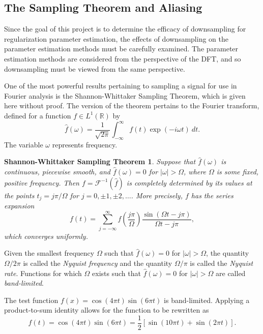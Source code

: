 \documentclass[12pt]{article}
\newcommand{\fcon}{f}
\newtheorem*{SWST}{Shannon-Whittaker Sampling Theorem}
\begin{document}
\subsection{The Sampling Theorem and Aliasing} \label{sec:The Sampling Theorem and Aliasing}
Since the goal of this project is to determine the efficacy of downsampling for regularization parameter estimation, the effects of downsampling on the parameter estimation methods must be carefully examined. The parameter estimation methods are considered from the perspective of the DFT, and so downsampling must be viewed from the same perspective. \par 
One of the most powerful results pertaining to sampling a signal for use in Fourier analysis is the Shannon-Whittaker Sampling Theorem, which is given here without proof. The version of the theorem pertains to the Fourier transform, defined for a function $f \in L^1(\mathbb{R})$ by
\begin{equation}
\widehat{f}(\omega) = \frac{1}{\sqrt{2\pi}}\int_{-\infty}^{\infty} f(t)\exp(-i\omega{t})\: dt. 
\label{eq:FourierTransform}
\end{equation}
The variable $\omega$ represents frequency. 
\begin{SWST}
Suppose that $\widehat{f}(\omega)$ is continuous, piecewise smooth, and $\widehat{f}(\omega) = 0$ for $|\omega| > \Omega$, where $\Omega$ is some fixed, positive frequency. Then $f = \mathcal{F}^{-1}(\widehat{f})$ is completely determined by its values at the points $t_j = j\pi/\Omega$ for $j = 0,\pm 1,\pm 2,\ldots$. More precisely, $f$ has the series expansion
\[f(t) = \sum_{j=-\infty}^{\infty} f\left(\frac{j\pi}{\Omega}\right)\frac{\sin(\Omega{t}-j\pi)}{\Omega{t}-j\pi},\]
which converges uniformly. 
\end{SWST}
Given the smallest frequency $\Omega$ such that $\widehat{f}(\omega) = 0$ for $|\omega| > \Omega$, the quantity $\Omega/2\pi$ is called the \textit{Nyquist frequency} and the quantity $\Omega/\pi$ is called the \textit{Nyquist rate}. Functions for which $\Omega$ exists such that $\widehat{f}(\omega) = 0$ for $|\omega| > \Omega$ are called \textit{band-limited}. \par 
The test function $\fcon(x) = \cos(4\pi{t})\sin(6\pi{t})$ is band-limited. Applying a product-to-sum identity allows for the function to be rewritten as
\begin{equation}
\fcon(t) = \cos(4\pi{t})\sin(6\pi{t}) = \frac{1}{2}\left[\sin(10\pi{t}) + \sin(2\pi{t})\right].
\label{eq:Test Function 1}
\end{equation}
\end{document}

